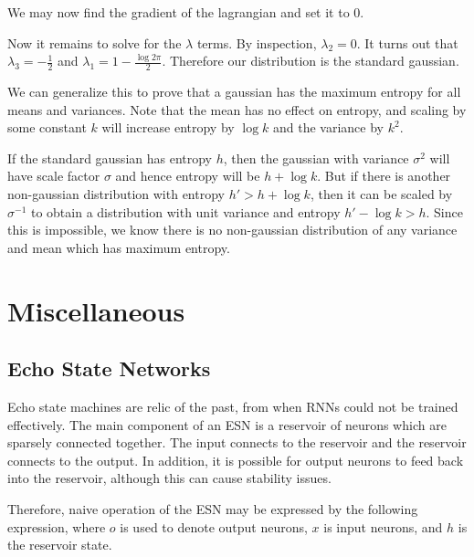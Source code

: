 \documentclass[12pt]{article}
\begin{document}
We may now find the gradient of the lagrangian and set it to 0.

Now it remains to solve for the $\lambda$ terms. By inspection, $\lambda_2 = 0$. It turns out that $\lambda_3 = -\frac{1}{2}$ and $\lambda_1 = 1-\frac{\log 2 \pi}{2}$. Therefore our distribution is the standard gaussian.

We can generalize this to prove that a gaussian has the maximum entropy for all means and variances. Note that the mean has no effect on entropy, and scaling by some constant $k$ will increase entropy by $\log k$ and the variance by $k^2$.

If the standard gaussian has entropy $h$, then the gaussian with variance $\sigma^2$ will have scale factor $\sigma$ and hence entropy will be $h+\log k$. But if there is another non-gaussian distribution with entropy $h' > h+\log k$, then it can be scaled by $\sigma^{-1}$ to obtain a distribution with unit variance and entropy $h' - \log k > h$. Since this is impossible, we know there is no non-gaussian distribution of any variance and mean which has maximum entropy.

\section{Miscellaneous}

\subsection{Echo State Networks}

Echo state machines are relic of the past, from when RNNs could not be trained effectively. The main component of an ESN is a reservoir of neurons which are sparsely connected together. The input connects to the reservoir and the reservoir connects to the output. In addition, it is possible for output neurons to feed back into the reservoir, although this can cause stability issues.

Therefore, naive operation of the ESN may be expressed by the following expression, where $o$ is used to denote output neurons, $x$ is input neurons, and $h$ is the reservoir state.

\end{document}
